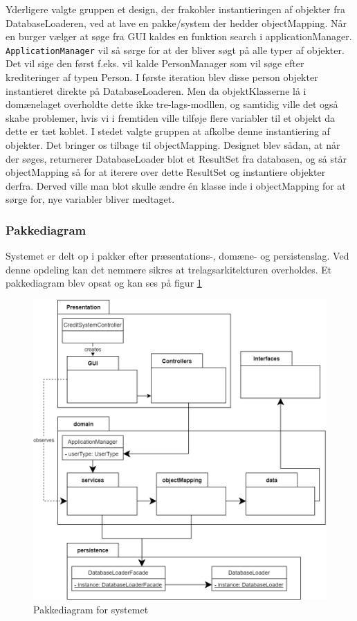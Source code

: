 Yderligere valgte gruppen et design, der frakobler instantieringen af objekter
fra DatabaseLoaderen, ved at lave en pakke/system der hedder objectMapping. Når
en burger vælger at søge fra GUI kaldes en funktion search i applicationManager.
\texttt{ApplicationManager} vil så sørge for at der bliver søgt på alle typer af
objekter. Det vil sige den først f.eks. vil kalde PersonManager som vil søge
efter krediteringer af typen Person. I første iteration blev disse person
objekter instantieret direkte på DatabaseLoaderen. Men da objektKlasserne lå i
domænelaget overholdte dette ikke  tre-lags-modllen, og samtidig ville det også
skabe problemer, hvis vi i fremtiden ville tilføje flere variabler til et objekt
da dette er tæt koblet. I stedet valgte gruppen at afkolbe denne instantiering
af objekter. Det bringer os tilbage til objectMapping. Designet blev sådan, at
når der søges, returnerer DatabaseLoader blot et ResultSet fra databasen, og så
står objectMapping så for at iterere over dette ResultSet og instantiere
objekter derfra. Derved ville man blot skulle ændre én klasse inde i
objectMapping for at sørge for, nye variabler bliver medtaget.


\subsubsection{Pakkediagram} Systemet er delt op i pakker efter præsentations-,
domæne- og persistenslag. Ved denne opdeling kan det nemmere sikres at
trelagsarkitekturen overholdes. Et pakkediagram blev opsat og kan ses på figur
\ref{fig:PackageDiagram}

\begin{figure}[H]
    \centering
\includegraphics[scale = 0.26]{images/PackageDiagram.png}
    \caption{Pakkediagram for systemet}
    \label{fig:PackageDiagram}
\end{figure}

